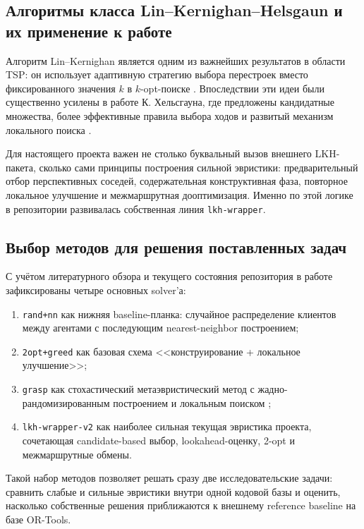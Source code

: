 \documentclass[a4paper,12pt]{article}
\begin{document}
\subsection{Алгоритмы класса Lin--Kernighan--Helsgaun и их применение к работе}

Алгоритм Lin--Kernighan является одним из важнейших результатов в области TSP: он использует адаптивную стратегию выбора перестроек вместо фиксированного значения \(k\) в \(k\)-opt-поиске \cite{lin1973}. Впоследствии эти идеи были существенно усилены в работе К. Хельсгауна, где предложены кандидатные множества, более эффективные правила выбора ходов и развитый механизм локального поиска \cite{helsgaun2000}.

Для настоящего проекта важен не столько буквальный вызов внешнего LKH-пакета, сколько сами принципы построения сильной эвристики: предварительный отбор перспективных соседей, содержательная конструктивная фаза, повторное локальное улучшение и межмаршрутная дооптимизация. Именно по этой логике в репозитории развивалась собственная линия \texttt{lkh-wrapper}.

\subsection{Выбор методов для решения поставленных задач}

С учётом литературного обзора и текущего состояния репозитория в работе зафиксированы четыре основных solver'а:
\begin{enumerate}[label=\arabic*.]
  \item \texttt{rand+nn} как нижняя baseline-планка: случайное распределение клиентов между агентами с последующим nearest-neighbor построением;
  \item \texttt{2opt+greed} как базовая схема <<конструирование + локальное улучшение>>;
  \item \texttt{grasp} как стохастический метаэвристический метод с жадно-рандомизированным построением и локальным поиском \cite{feo1995};
  \item \texttt{lkh-wrapper-v2} как наиболее сильная текущая эвристика проекта, сочетающая candidate-based выбор, lookahead-оценку, 2-opt и межмаршрутные обмены.
\end{enumerate}

Такой набор методов позволяет решать сразу две исследовательские задачи: сравнить слабые и сильные эвристики внутри одной кодовой базы и оценить, насколько собственные решения приближаются к внешнему reference baseline на базе OR-Tools.
\end{document}
